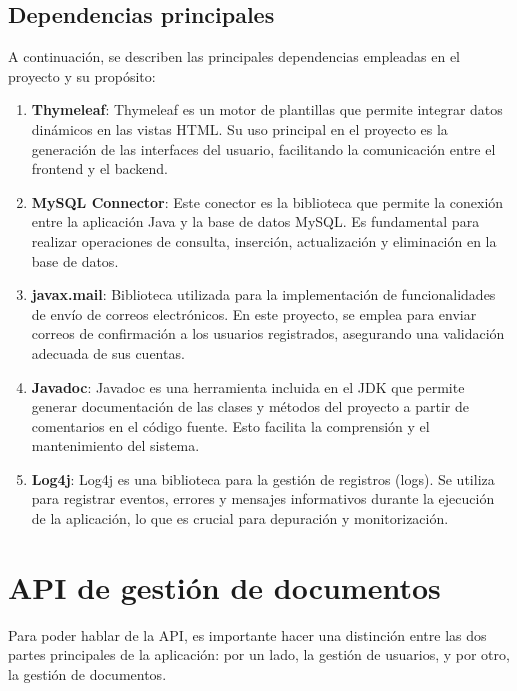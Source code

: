 \documentclass[draft]{scrbook}
\begin{document}
\subsection{Dependencias principales}

A continuación, se describen las principales dependencias empleadas en el proyecto y su propósito:

\begin{enumerate}
    \item \textbf{Thymeleaf}:
    Thymeleaf es un motor de plantillas que permite integrar datos dinámicos en las vistas HTML. Su uso principal en el proyecto es la generación de las interfaces del usuario, facilitando la comunicación entre el frontend y el backend.

    \item \textbf{MySQL Connector}:
    Este conector es la biblioteca que permite la conexión entre la aplicación Java y la base de datos MySQL. Es fundamental para realizar operaciones de consulta, inserción, actualización y eliminación en la base de datos.

    \item \textbf{javax.mail}:
    Biblioteca utilizada para la implementación de funcionalidades de envío de correos electrónicos. En este proyecto, se emplea para enviar correos de confirmación a los usuarios registrados, asegurando una validación adecuada de sus cuentas.

    \item \textbf{Javadoc}:
    Javadoc es una herramienta incluida en el JDK que permite generar documentación de las clases y métodos del proyecto a partir de comentarios en el código fuente. Esto facilita la comprensión y el mantenimiento del sistema.

    \item \textbf{Log4j}:
    Log4j es una biblioteca para la gestión de registros (logs). Se utiliza para registrar eventos, errores y mensajes informativos durante la ejecución de la aplicación, lo que es crucial para depuración y monitorización.

\end{enumerate}



\section{ API de gestión de documentos}

Para poder hablar de la API, es importante hacer una distinción entre las dos partes principales de la aplicación: por un lado, la gestión de usuarios, y por otro, la gestión de documentos.
\end{document}
